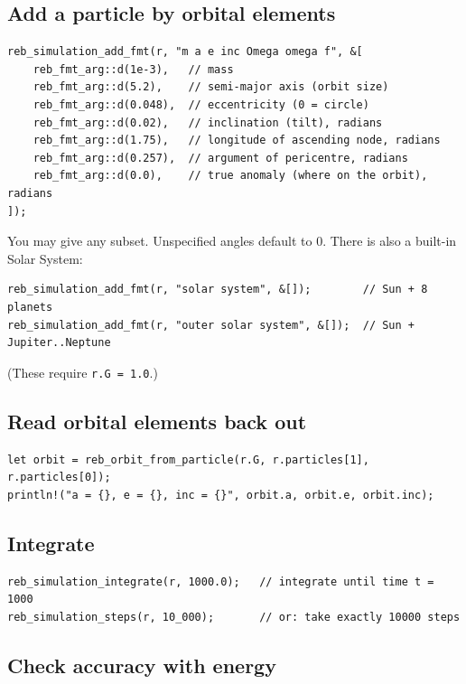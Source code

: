 \documentclass[11pt]{article}
\begin{document}
\subsection{Add a particle by orbital elements}

\begin{lstlisting}
reb_simulation_add_fmt(r, "m a e inc Omega omega f", &[
    reb_fmt_arg::d(1e-3),   // mass
    reb_fmt_arg::d(5.2),    // semi-major axis (orbit size)
    reb_fmt_arg::d(0.048),  // eccentricity (0 = circle)
    reb_fmt_arg::d(0.02),   // inclination (tilt), radians
    reb_fmt_arg::d(1.75),   // longitude of ascending node, radians
    reb_fmt_arg::d(0.257),  // argument of pericentre, radians
    reb_fmt_arg::d(0.0),    // true anomaly (where on the orbit), radians
]);
\end{lstlisting}

You may give any subset. Unspecified angles default to 0. There is also a built-in Solar System:

\begin{lstlisting}
reb_simulation_add_fmt(r, "solar system", &[]);        // Sun + 8 planets
reb_simulation_add_fmt(r, "outer solar system", &[]);  // Sun + Jupiter..Neptune
\end{lstlisting}

(These require \texttt{r.G = 1.0}.)

\subsection{Read orbital elements back out}

\begin{lstlisting}
let orbit = reb_orbit_from_particle(r.G, r.particles[1], r.particles[0]);
println!("a = {}, e = {}, inc = {}", orbit.a, orbit.e, orbit.inc);
\end{lstlisting}

\subsection{Integrate}

\begin{lstlisting}
reb_simulation_integrate(r, 1000.0);   // integrate until time t = 1000
reb_simulation_steps(r, 10_000);       // or: take exactly 10000 steps
\end{lstlisting}

\subsection{Check accuracy with energy}
\end{document}
